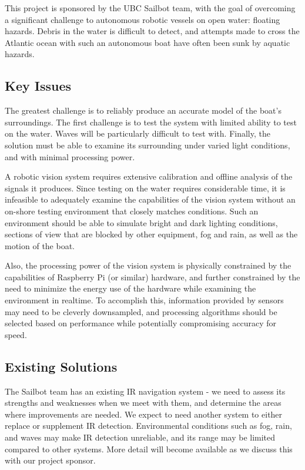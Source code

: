 This project is sponsored by the UBC Sailbot team, with the goal of overcoming a significant challenge to autonomous robotic vessels on open water: floating hazards. Debris in the water is difficult to detect, and attempts made to cross the Atlantic ocean with such an autonomous boat have often been sunk by aquatic hazards.

\subsection{\label{sec:intro:key-issues}Key Issues}
The greatest challenge is to reliably produce an accurate model of the boat's surroundings. The first challenge is to test the system with limited ability to test on the water.  Waves will be particularly difficult to test with.  Finally, the solution must be able to examine its surrounding under varied light conditions, and with minimal processing power.

A robotic vision system requires extensive calibration and offline analysis of the signals it produces. Since testing on the water requires considerable time, it is infeasible to adequately examine the capabilities of the vision system without an on-shore testing environment that closely matches conditions. Such an environment should be able to simulate bright and dark lighting conditions, sections of view that are blocked by other equipment, fog and rain, as well as the motion of the boat.

Also, the processing power of the vision system is physically constrained by the capabilities of Raspberry Pi (or similar) hardware, and further constrained by the need to minimize the energy use of the hardware while examining the environment in realtime. To accomplish this, information provided by sensors may need to be cleverly downsampled, and processing algorithms should be selected based on performance while potentially compromising accuracy for speed.

\subsection{\label{sec:intro:existing-solutions}Existing Solutions}

The Sailbot team has an existing IR navigation system - we need to assess its strengths and weaknesses when we meet with them, and determine the areas where improvements are needed.  We expect to need another system to either replace or supplement IR detection.  Environmental conditions such as fog, rain, and waves may make IR detection unreliable, and its range may be limited compared to other systems.  More detail will become available as we discuss this with our project sponsor.

